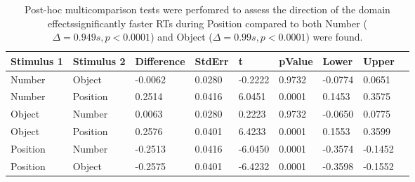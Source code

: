\begin{table}
\centering
\begin{tabular}[0.2em]{@{}lllllllll@{}}\toprule
Stimulus 1 & Stimulus 2 & Difference & StdErr & t & pValue & Lower & Upper\\\toprule[0.2em]
Number & Object & -0.0062 & 0.0280 & -0.2222 & 0.9732 & -0.0774 & 0.0651 \\\midrule
Number & Position & 0.2514 & 0.0416 & 6.0451 & 0.0001 & 0.1453 & 0.3575 \\\midrule
Object & Number & 0.0063 & 0.0280 & 0.2223 & 0.9732 & -0.0650 & 0.0775 \\\midrule
Object & Position & 0.2576 & 0.0401 & 6.4233 & 0.0001 & 0.1553 & 0.3599 \\\midrule
Position & Number & -0.2513 & 0.0416 & -6.0450 & 0.0001 & -0.3574 & -0.1452 \\\midrule
Position & Object & -0.2575 & 0.0401 & -6.4232 & 0.0001 & -0.3598 & -0.1552 \\\bottomrule[0.2em]
\end{tabular}
\caption{Post-hoc multicomparison tests were perfomred to assess the direction of the domain effectssignificantly faster RTs during Position compared to both Number ($\Delta=0.949s,p<0.0001$) and Object ($\Delta=0.99s,p<0.0001$) were found.\label{tabel:behStudy1RTphdomain}}
\end{table}
